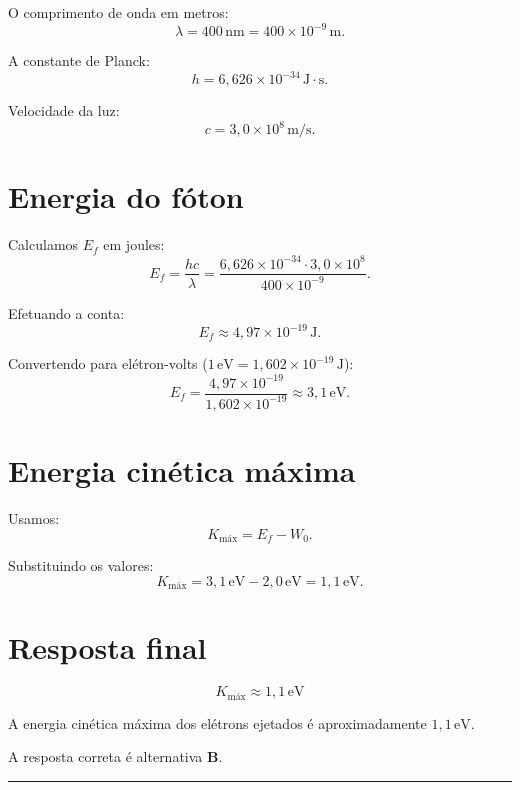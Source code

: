 \documentclass[a4paper,12pt]{article}
\begin{document}
\begin{flushleft}
O comprimento de onda em metros:
\[
\lambda = 400\,\mathrm{nm} = 400 \times 10^{-9}\,\mathrm{m}.
\]

A constante de Planck:
\[
h = 6{,}626 \times 10^{-34}\, \mathrm{J\cdot s}.
\]

Velocidade da luz:
\[
c = 3{,}0 \times 10^{8}\, \mathrm{m/s}.
\]

\section*{Energia do fóton}

Calculamos \(E_f\) em joules:
\[
E_f = \frac{hc}{\lambda} =
\frac{6{,}626 \times 10^{-34} \cdot 3{,}0 \times 10^{8}}{400 \times 10^{-9}}.
\]

Efetuando a conta:
\[
E_f \approx 4{,}97 \times 10^{-19}\, \mathrm{J}.
\]

Convertendo para elétron-volts (\(1\,\mathrm{eV} = 1{,}602 \times 10^{-19}\,\mathrm{J}\)):
\[
E_f = \frac{4{,}97 \times 10^{-19}}{1{,}602 \times 10^{-19}} \approx 3,1\,\mathrm{eV}.
\]

\section*{Energia cinética máxima}

Usamos:
\[
K_{\text{máx}} = E_f - W_0.
\]

Substituindo os valores:
\[
K_{\text{máx}} = 3{,}1\,\mathrm{eV} - 2{,}0\,\mathrm{eV} = 1{,}1\,\mathrm{eV}.
\]

\section*{Resposta final}

\[
\boxed{
K_{\text{máx}} \approx 1{,}1\,\mathrm{eV}
}
\]

A energia cinética máxima dos elétrons ejetados é aproximadamente \(1{,}1\,\mathrm{eV}\).

A resposta correta é alternativa \colorbox{green!50}{\textbf{B}}.
\end{flushleft}

\noindent\rule{\linewidth}{0.6pt}\\
\end{document}

